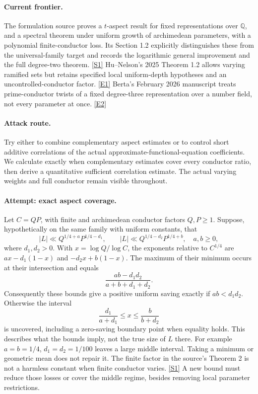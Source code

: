 \documentclass[11pt,a4paper]{article}
\newcommand{\Q}{\mathbb{Q}}
\newcommand{\sref}[2]{\hyperlink{source:#1:#2}{[S#2]}}
\newcommand{\eref}[2]{\hyperlink{extra:#1:#2}{[E#2]}}
\numberwithin{equation}{section}
\begin{document}
\paragraph{Current frontier.}
The formulation source proves a $t$-aspect result for fixed representations
over $\Q$, and a spectral theorem under uniform growth of archimedean
parameters, with a polynomial finite-conductor loss. Its Section 1.2
explicitly distinguishes these from the universal-family target and records
the logarithmic general improvement and the full degree-two theorem.
\sref{30006752}{1} Hu--Nelson's 2025 Theorem 1.2 allows varying ramified sets but
retains specified local uniform-depth hypotheses and an uncontrolled-conductor
factor. \eref{30006752}{1} Berta's February 2026 manuscript treats prime-conductor
twists of a fixed degree-three representation over a number field, not every
parameter at once. \eref{30006752}{2}

\paragraph{Attack route.}
Try either to combine complementary aspect estimates or to control short
additive correlations of the actual approximate-functional-equation
coefficients. We calculate exactly when complementary estimates cover every
conductor ratio, then derive a quantitative sufficient correlation estimate.
The actual varying weights and full conductor remain visible throughout.

\paragraph{Attempt: exact aspect coverage.}
Let $C=QP$, with finite and archimedean conductor factors $Q,P\ge1$. Suppose,
hypothetically on the same family with uniform constants, that
\[
 |L|\ll Q^{1/4+a}P^{1/4-d_1},\qquad
 |L|\ll Q^{1/4-d_2}P^{1/4+b},
 \quad a,b\ge0,
\]
where $d_1,d_2>0$. With $x=\log Q/\log C$, the exponents relative to
$C^{1/4}$ are $ax-d_1(1-x)$ and $-d_2x+b(1-x)$. The maximum of their
minimum occurs at their intersection and equals
\begin{equation}\label{30006752:coverage}
 \frac{ab-d_1d_2}{a+b+d_1+d_2}.
\end{equation}
Consequently these bounds give a positive uniform saving exactly if
$ab<d_1d_2$. Otherwise the interval
\[
 \frac{d_1}{a+d_1}\le x\le\frac{b}{b+d_2}
\]
is uncovered, including a zero-saving boundary point when equality holds.
This describes what the bounds imply, not the true size of $L$ there.
For example $a=b=1/4$, $d_1=d_2=1/100$ leaves a large middle interval.
Taking a minimum or geometric mean does not repair it. The finite factor
in the source's Theorem 2 is not a harmless constant when finite conductor
varies. \sref{30006752}{1} A new bound must reduce those losses or cover the
middle regime, besides removing local parameter restrictions.
\end{document}
